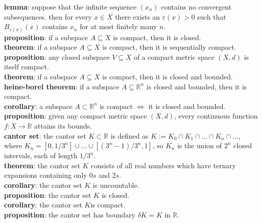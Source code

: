 \documentclass[a4paper]{article}
\begin{document}
\begin{framed}
	\noindent
	\textbf{lemma}: suppose that the infinite sequence $(x_n)$ contains no convergent subsequences. then for every $x \in X$ there exists an $\varepsilon(x) > 0$ such that $B_{\varepsilon(x)}(x)$ contains $x_n$ for at most finitely many $n$.\\
	
	\noindent
	\textbf{proposition}: if a subspace $A \subseteq X$ is compact, then it is closed.\\
	
	\noindent
	\textbf{theorem}: if a subspace $A \subseteq X$ is compact, then it is sequentially compact.\\
	
	\noindent
	\textbf{proposition}: any closed subspace $V \subseteq X$ of a compact metric space $(X,d)$ is itself compact.\\
	
	\noindent
	\textbf{theorem}: if a subspace $A \subseteq X$ is compact, then it is closed and bounded.\\
	
	\noindent
	\textbf{heine-borel theorem}: if a subspace $A \subseteq \mathbb{R}^n$ is closed and bounded, then it is compact.\\
	
	\noindent
	\textbf{corollary}: a subspace $A \subset \mathbb{R}^n$ is compact $\iff$ it is closed and bounded.\\
	
	\noindent
	\textbf{proposition}: given any compact metric space $(X,d)$, every continuous function $f: X \rightarrow \mathbb{R}$ attains its bounds.\\
	
	\noindent
	\textbf{cantor set}: the cantor set $K \subset \mathbb{R}$ is defined as $K := K_0 \cap K_1 \cap ... \cap K_n \cap ...$, where $K_n = [0, 1/3^n] \cup ... \cup [(3^n - 1) / 3^n, 1]$, so $K_n$ is the union of $2^n$ closed intervals, each of length $1/3^n$.\\
	
	\noindent
	\textbf{theorem}: the cantor set $K$ consists of all real numbers which have ternary expansions containing only $0s$ and $2s$.\\
	
	\noindent
	\textbf{corollary}: the cantor set $K$ is uncountable.\\
	
	\noindent
	\textbf{proposition}: the cantor set $K$ is closed.\\
	
	\noindent
	\textbf{corollary}: the cantor set $K$is compact.\\
	
	\noindent
	\textbf{proposition}: the cantor set has boundary $\delta K = K$ in $\mathbb{R}$.\\
\end{framed}
\end{document}
